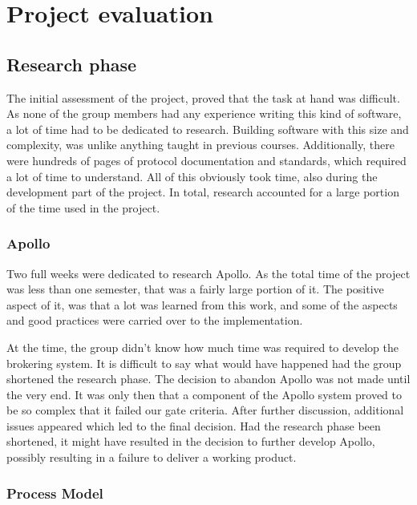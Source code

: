 
\chapter{Project evaluation}
\label{ch:project_evaluation}

\section{Research phase}
\label{sec:project_evaluation-research_phase}

The initial assessment of the project, proved that the task at hand was difficult. As none of the group members had any experience writing this kind of software, a lot of time had to be dedicated to research. Building software with this size and complexity, was unlike anything taught in previous courses. Additionally, there were hundreds of pages of protocol documentation and standards, which required a lot of time to understand. All of this obviously took time, also during the development part of the project. In total, research accounted for a large portion of the time used in the project.

\subsection{Apollo}
\label{subsec:project_evaluation-research_phase-apollo}

Two full weeks were dedicated to research Apollo. As the total time of the project was less than one semester, that was a fairly large portion of it. The positive aspect of it, was that a lot was learned from this work, and some of the aspects and good practices were carried over to the implementation.

At the time, the group didn't know how much time was required to develop the brokering system. It is difficult to say what would have happened had the group shortened the research phase. The decision to abandon Apollo was not made until the very end. It was only then that a component of the Apollo system proved to be so complex that it failed our gate criteria. After further discussion, additional issues appeared which led to the final decision. Had the research phase been shortened, it might have resulted in the decision to further develop Apollo, possibly resulting in a failure to deliver a working product.


\subsection{Process Model}
\label{subsec:project_evaluation-research_phase-process_model}

